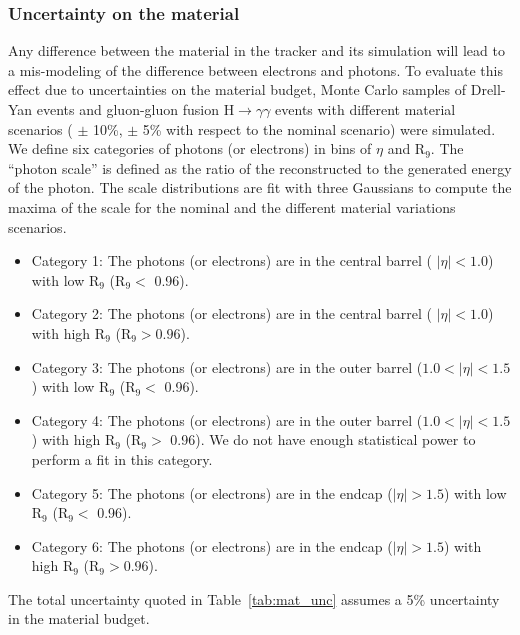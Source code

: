 \subsubsection{Uncertainty on the material}

Any difference between the material in the tracker and its simulation will lead to a mis-modeling of the difference between electrons and photons. To evaluate this effect due to uncertainties on the material budget, Monte Carlo samples of Drell-Yan events and gluon-gluon fusion H$\rightarrow\gamma\gamma$ events with different material scenarios ( $\pm$ 10\%, $\pm$ 5\% with respect to the nominal scenario) were simulated. We define six categories of photons (or electrons) in bins of $\eta$ and R$_{9}$. The “photon scale” is defined as the ratio of the reconstructed to the generated energy of the photon. The scale distributions are fit with three Gaussians to compute the maxima of the scale for the nominal and the different material variations scenarios.
\begin{itemize}
    \item Category 1: The photons (or electrons) are in the central barrel ( $|\eta| < 1.0$) with low R$_{9}$ (R$_9 <$ 0.96).
    \item Category 2: The photons (or electrons) are in the central barrel ( $|\eta| < 1.0$) with high R$_9$ (R$_9 > 0.96$).
    \item Category 3: The photons (or electrons) are in the outer barrel ($1.0 < |\eta| < 1.5$) with low R$_9$ (R$_9 <$ 0.96).
    \item Category 4: The photons (or electrons) are in the outer barrel ($1.0 < |\eta| < 1.5$) with high R$_9$ (R$_9 >$ 0.96). We do not have enough statistical power to perform a fit in this category.
    \item Category 5: The photons (or electrons) are in the endcap ($|\eta| > 1.5$) with low R$_9$ (R$_9 <$ 0.96).
    \item Category 6: The photons (or electrons) are in the endcap ($|\eta| > 1.5$) with high R$_9$ (R$_9 > 0.96$).
\end{itemize}

The total uncertainty quoted in Table~\ref{tab:mat_unc} assumes a 5\% uncertainty in the material budget.

